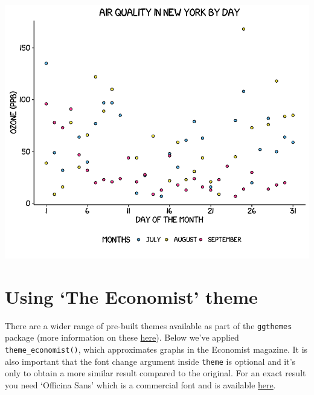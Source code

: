 \documentclass[]{article}
\begin{document}
\begin{center}\includegraphics{5_Scatter_Plots_pdf/scatter_13-1} \end{center}

\section{\texorpdfstring{Using `The Economist'
theme}{Using The Economist theme}}\label{using-the-economist-theme}

There are a wider range of pre-built themes available as part of the
\texttt{ggthemes} package (more information on these
\href{https://cran.r-project.org/web/packages/ggthemes/vignettes/ggthemes.html}{here}).
Below we've applied \texttt{theme\_economist()}, which approximates
graphs in the Economist magazine. It is also important that the font
change argument inside \texttt{theme} is optional and it's only to
obtain a more similar result compared to the original. For an exact
result you need `Officina Sans' which is a commercial font and is
available \href{http://www.myfonts.com/fonts/itc/officina-sans/}{here}.
\end{document}
